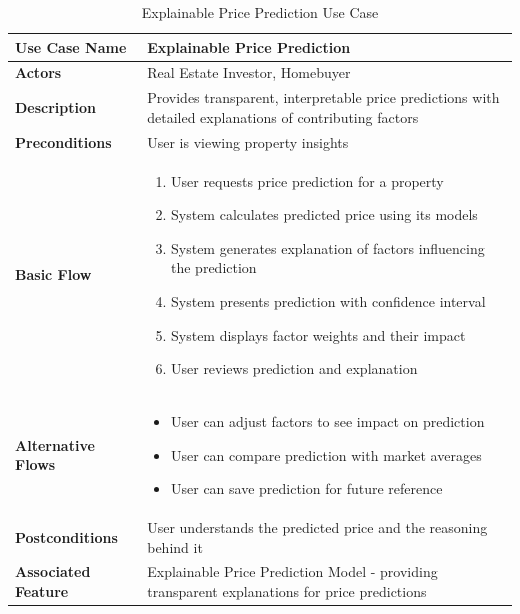 \begin{table}[h]
	\centering
	\renewcommand{\arraystretch}{1.3}
	\begin{tabular}{|>{\columncolor[gray]{0.95}}p{}|p{}|}
		\hline
		\rowcolor[gray]{0.9} \textbf{Use Case Name} & \textbf{Explainable Price Prediction}                                                                    \\
		\hline
		\textbf{Actors}                             & Real Estate Investor, Homebuyer                                                                          \\
		\hline
		\textbf{Description}                        & Provides transparent, interpretable price predictions with detailed explanations of contributing factors \\
		\hline
		\textbf{Preconditions}                      & User is viewing property insights                                                                        \\
		\hline
		\textbf{Basic Flow}                         &                                                                                                          
		\begin{enumerate}
		\item User requests price prediction for a property
		\item System calculates predicted price using its models
		\item System generates explanation of factors influencing the prediction
		\item System presents prediction with confidence interval
		\item System displays factor weights and their impact
		\item User reviews prediction and explanation
		\end{enumerate} \\
		\hline
		\textbf{Alternative Flows}                  &                                                                                                          
		\begin{itemize}
		\item User can adjust factors to see impact on prediction
		\item User can compare prediction with market averages
		\item User can save prediction for future reference
		\end{itemize} \\
		\hline
		\textbf{Postconditions}                     & User understands the predicted price and the reasoning behind it                                         \\
		\hline
		\textbf{Associated Feature}                 & Explainable Price Prediction Model - providing transparent explanations for price predictions            \\
		\hline
	\end{tabular}
	\caption{Explainable Price Prediction Use Case}
	\label{tab:prediction-use-case}
\end{table}

